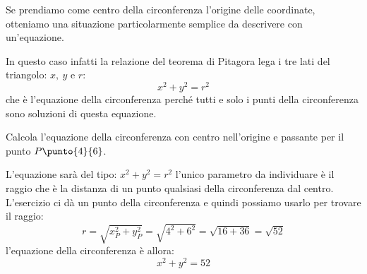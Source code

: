 \centering
\begin{minipage}[]{.48\textwidth}

 Se prendiamo come centro della circonferenza l'origine delle coordinate, 
otteniamo una situazione particolarmente semplice da descrivere con 
un'equazione.

In questo caso infatti la relazione del teorema di Pitagora lega i tre lati del 
triangolo: \(x,~y \text{ e } r\):
\[x^2 + y^2 = r^2\]
che è l'equazione della circonferenza perché tutti e solo i punti 
della circonferenza sono soluzioni di questa equazione.
\end{minipage}
\hfill
\begin{minipage}[]{.48\textwidth}
\begin{center}
\begin{inaccessibleblock}
  \circonfO
\end{inaccessibleblock}
\end{center}
\end{minipage}

\begin{esempio}
Calcola l'equazione della circonferenza con centro nell'origine e passante per 
il punto \(P\punto{4}{6}\).

L'equazione sarà del tipo: \(x^2 + y^2 = r^2\) l'unico parametro da individuare 
è il raggio che è la distanza di un punto qualsiasi della circonferenza dal 
centro. L'esercizio ci dà un punto della circonferenza e quindi possiamo usarlo 
per trovare il raggio:
\[r = \sqrt{x_P^2 + y_P^2} = \sqrt{4^2 + 6^2} = \sqrt{16 + 36} = \sqrt{52}\]
l'equazione della circonferenza è allora:
\[x^2 + y^2 = 52\]
\end{esempio}


